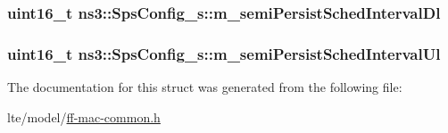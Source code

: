 \subsubsection[{\texorpdfstring{m\+\_\+semi\+Persist\+Sched\+Interval\+Dl}{m_semiPersistSchedIntervalDl}}]{\setlength{\rightskip}{0pt plus 5cm}uint16\+\_\+t ns3\+::\+Sps\+Config\+\_\+s\+::m\+\_\+semi\+Persist\+Sched\+Interval\+Dl}\hypertarget{structns3_1_1SpsConfig__s_aa82c2e6882a42613c302b4239d235343}{}\label{structns3_1_1SpsConfig__s_aa82c2e6882a42613c302b4239d235343}
\subsubsection[{\texorpdfstring{m\+\_\+semi\+Persist\+Sched\+Interval\+Ul}{m_semiPersistSchedIntervalUl}}]{\setlength{\rightskip}{0pt plus 5cm}uint16\+\_\+t ns3\+::\+Sps\+Config\+\_\+s\+::m\+\_\+semi\+Persist\+Sched\+Interval\+Ul}\hypertarget{structns3_1_1SpsConfig__s_aa70dbd9ac18006670a927c6c52787a65}{}\label{structns3_1_1SpsConfig__s_aa70dbd9ac18006670a927c6c52787a65}


The documentation for this struct was generated from the following file\+:\begin{DoxyCompactItemize}
\item 
lte/model/\hyperlink{ff-mac-common_8h}{ff-\/mac-\/common.\+h}\end{DoxyCompactItemize}
